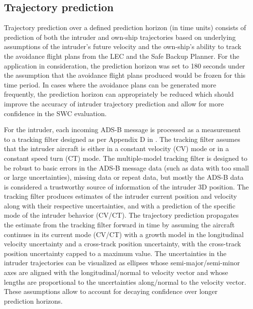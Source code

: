 \subsection{Trajectory prediction} 
Trajectory prediction over a defined prediction horizon (in time units) consists of prediction of both the intruder and own-ship trajectories based on underlying assumptions of the intruder's future velocity and the own-ship's ability to track the avoidance flight plans from the LEC and the Safe Backup Planner. For the application in consideration, the prediction horizon was set to 180 seconds under the assumption that the avoidance flight plans produced would be frozen for this time period. In cases where the avoidance plans can be generated more frequently, the prediction horizon can appropriately be reduced which should improve the accuracy of intruder trajectory prediction and allow for more confidence in the SWC evaluation.

For the intruder, each incoming ADS-B message is processed as a measurement to a tracking filter designed as per Appendix D in \cite{DO_366A}. The tracking filter assumes that the intruder aircraft is either in a constant velocity (CV) mode or in a constant speed turn (CT) mode. The multiple-model tracking filter is designed to be robust to basic errors in the ADS-B message data (such as data with too small or large uncertainties), missing data or repeat data, but mostly the ADS-B data is considered a trustworthy source of information of the intruder 3D position. The tracking filter produces estimates of the intruder current position and velocity along with their respective uncertainties, and with a prediction of the specific mode of the intruder behavior (CV/CT). The trajectory prediction propagates the estimate from the tracking filter forward in time by assuming the aircraft continues in its current mode (CV/CT) with a growth model in the longitudinal velocity uncertainty and a cross-track position uncertainty, with the cross-track position uncertainty capped to a maximum value. The uncertainties in the intruder trajectories can be visualized as ellipses whose semi-major/semi-minor axes are aligned with the longitudinal/normal to velocity vector and whose lengths are proportional to the uncertainties along/normal to the velocity vector. These assumptions allow to account for decaying confidence over longer prediction horizons.

